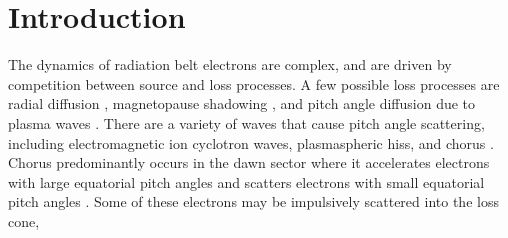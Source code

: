 \documentclass[draft, linenumbers]{agujournal}
\begin{document}
%
% 
% 
% 

\section{Introduction}\label{Intro}
The dynamics of radiation belt electrons are complex, and are driven by competition between source and loss processes. A few possible loss processes are radial diffusion \citep{Shprits2004}, magnetopause shadowing \citep{Ukhorskiy2006}, and pitch angle  diffusion due to  plasma waves \citep[e.g.][]{Abel1998_1, Summers1998, Meredith2002, Selesnick2003, Horne2003, Thorne2005}.   There are a variety of waves that cause pitch angle scattering, including electromagnetic ion cyclotron waves, plasmaspheric hiss, and  chorus \citep{Millan2007, Thorne2010}.  Chorus predominantly occurs in the dawn sector \citep{Li2009} where it accelerates electrons with large equatorial pitch angles and scatters electrons with small equatorial pitch angles \citep{Horne2003}. Some of these electrons may be impulsively scattered into the loss cone, 
\end{document}
